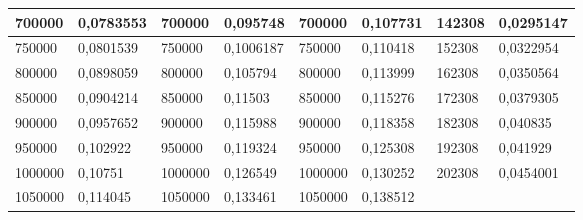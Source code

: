 \documentclass[11pt,openany]{book}
\begin{document}
\begin{table}[!ht]
\begin{tabular}{|l|l|l|l|l|l|l|l|}
        700000                                            & 0,0783553                                          & 700000                                              & 0,095748                                            & 700000          & 0,107731        & 142308          & 0,0295147       \\ \hline
        750000                                            & 0,0801539                                          & 750000                                              & 0,1006187                                           & 750000          & 0,110418        & 152308          & 0,0322954       \\ \hline
        800000                                            & 0,0898059                                          & 800000                                              & 0,105794                                            & 800000          & 0,113999        & 162308          & 0,0350564       \\ \hline
        850000                                            & 0,0904214                                          & 850000                                              & 0,11503                                             & 850000          & 0,115276        & 172308          & 0,0379305       \\ \hline
        900000                                            & 0,0957652                                          & 900000                                              & 0,115988                                            & 900000          & 0,118358        & 182308          & 0,040835        \\ \hline
        950000                                            & 0,102922                                           & 950000                                              & 0,119324                                            & 950000          & 0,125308        & 192308          & 0,041929        \\ \hline
        1000000                                           & 0,10751                                            & 1000000                                             & 0,126549                                            & 1000000         & 0,130252        & 202308          & 0,0454001       \\ \hline
        1050000                                           & 0,114045                                           & 1050000                                             & 0,133461                                            & 1050000         & 0,138512        & ~               & ~               \\ \hline

\end{tabular}
\end{table}
\end{document}
